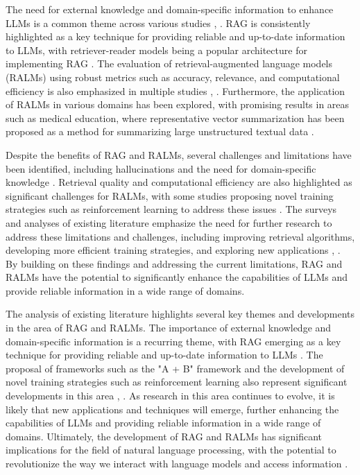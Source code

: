 \documentclass[conference]{IEEEtran}
\begin{document}
The need for external knowledge and domain-specific information to enhance LLMs is a common theme across various studies \cite{b6}, \cite{b7}. RAG is consistently highlighted as a key technique for providing reliable and up-to-date information to LLMs, with retriever-reader models being a popular architecture for implementing RAG \cite{b8}. The evaluation of retrieval-augmented language models (RALMs) using robust metrics such as accuracy, relevance, and computational efficiency is also emphasized in multiple studies \cite{b9}, \cite{b10}. Furthermore, the application of RALMs in various domains has been explored, with promising results in areas such as medical education, where representative vector summarization has been proposed as a method for summarizing large unstructured textual data \cite{b11}.

Despite the benefits of RAG and RALMs, several challenges and limitations have been identified, including hallucinations and the need for domain-specific knowledge \cite{b12}. Retrieval quality and computational efficiency are also highlighted as significant challenges for RALMs, with some studies proposing novel training strategies such as reinforcement learning to address these issues \cite{b13}. The surveys and analyses of existing literature emphasize the need for further research to address these limitations and challenges, including improving retrieval algorithms, developing more efficient training strategies, and exploring new applications \cite{b14}, \cite{b15}. By building on these findings and addressing the current limitations, RAG and RALMs have the potential to significantly enhance the capabilities of LLMs and provide reliable information in a wide range of domains.

The analysis of existing literature highlights several key themes and developments in the area of RAG and RALMs. The importance of external knowledge and domain-specific information is a recurring theme, with RAG emerging as a key technique for providing reliable and up-to-date information to LLMs \cite{b16}. The proposal of frameworks such as the "A + B" framework and the development of novel training strategies such as reinforcement learning also represent significant developments in this area \cite{b17}, \cite{b18}. As research in this area continues to evolve, it is likely that new applications and techniques will emerge, further enhancing the capabilities of LLMs and providing reliable information in a wide range of domains. Ultimately, the development of RAG and RALMs has significant implications for the field of natural language processing, with the potential to revolutionize the way we interact with language models and access information \cite{b19}.
\end{document}
